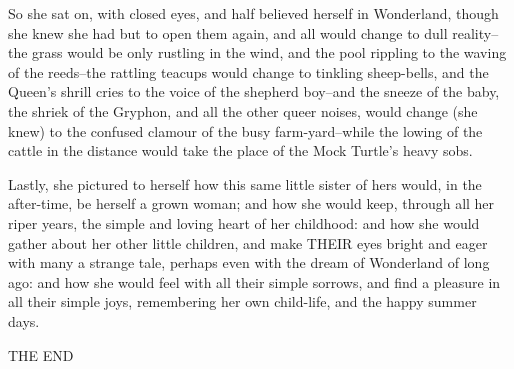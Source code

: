 \documentclass[12pt]{book}
\begin{document}
  So she sat on, with closed eyes, and half believed herself in
Wonderland, though she knew she had but to open them again, and
all would change to dull reality--the grass would be only
rustling in the wind, and the pool rippling to the waving of the
reeds--the rattling teacups would change to tinkling sheep-bells,
and the Queen's shrill cries to the voice of the shepherd
boy--and the sneeze of the baby, the shriek of the Gryphon, and
all the other queer noises, would change (she knew) to the
confused clamour of the busy farm-yard--while the lowing of the
cattle in the distance would take the place of the Mock Turtle's
heavy sobs.

  Lastly, she pictured to herself how this same little sister of
hers would, in the after-time, be herself a grown woman; and how
she would keep, through all her riper years, the simple and
loving heart of her childhood:  and how she would gather about
her other little children, and make THEIR eyes bright and eager
with many a strange tale, perhaps even with the dream of
Wonderland of long ago:  and how she would feel with all their
simple sorrows, and find a pleasure in all their simple joys,
remembering her own child-life, and the happy summer days.

\begin{center}
                             THE END
\end{center}
\end{document}
